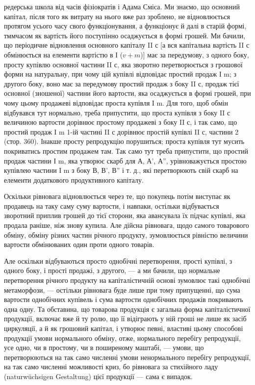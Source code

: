 \parcont{}  %
редерська школа від часів фізіократів і Адама Сміса. Ми знаємо, що основний
капітал, після того як витрату на нього вже раз зроблено, не відновлюється
протягом усього часу свого функціонування, а функціонує й
далі в старій формі, тммчасом як вартість його поступінно осаджується
в формі грошей. Ми бачили, що періодичне відновлення основного капіталу
II с [а вся капітальна вартість II с обмінюється на елементи вартістю
в І ($v + m$)] має за передумову, з одного боку, просту купівлю
основної частини II с, яка зворотно перетворюється з грошової форми
на натуральну, при чому цій купівлі відповідає простий продаж І m;
з другого боку, воно має за передумову простий продаж з боку
II с, продаж тієї основної (зношеної) частини його вартости, яка осаджується
в формі грошей, при чому цьому продажеві відповідає проста
купівля І m. Для того, щоб обмін відбувався тут нормально, треба припустити,
що проста купівля з боку II с величиною вартости дорівнює
простому продажеві з боку II с, і так само, що простий продаж І m
1-ій частині II с дорівнює простій купівлі II с, частини 2 (стор. 360).
Інакше просту репродукцію порушиться; проста купівля тут мусить
покриватись простим продажем там. Так само тут треба припустити,
що простий продаж частини І m, яка утворює скарб для А,
А', А'', урівноважується простою купівлею частини І m з боку В, В', В''
і т. д., які перетворюють свій скарб на елементи додаткового продуктивного
капіталу.

Оскільки рівновага відновлюється через те, що покупець потім виступає
як продавець на таку саму суму вартости, і навпаки, остільки відбувається
зворотний приплив грошей до тієї сторони, яка авансувала їх
підчас купівлі, яка продала раніше, ніж знову купила. Але дійсна рівновага,
щодо самого товарового обміну, обміну різних частин річного продукту,
зумовлюється рівністю величини вартости обмінюваних один проти
одного товарів.

Але оскільки відбуваються просто однобічні перетворення, прості
купівлі, з одного боку, і прості продажі, з другого, — а ми бачили, що
нормальне перетворення річного продукту на капіталістичній основі зумовлює
такі однобічні метаморфози, — остільки рівновага буде лише при
тому припущенні, що сума вартости однобічних купівель і сума вартости
однобічних продажів покривають одна одну. Та обставина, що товарова
продукція є загальна форма капіталістичної продукції, включає вже й ту
ролю, що її відіграють у ній гроші не лише як засіб циркуляції, а й
як грошовий капітал, і утворює певні, властиві цьому способові продукції
умови нормального обміну, отже, нормального перебігу репродукції,
усе одно, чи в простому, чи в поширеному маштабі, — умови,
що перетворюються на так само численні умови ненормального перебігу
репродукції, на так само численні можливості криз, бо рівновага за стихійного
ладу (naturwüchsigen Gestaltung) цієї продукції — сама є випадок.

